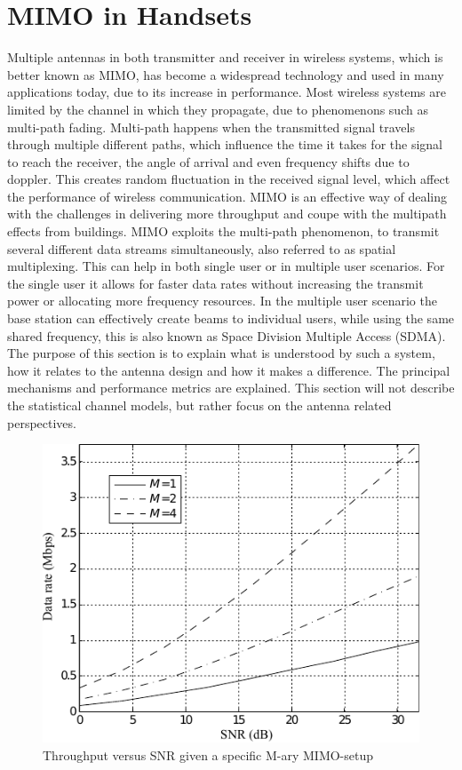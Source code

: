 \section{MIMO in Handsets}
\label{sec:mimo_in_handsets}
Multiple antennas in both transmitter and receiver in wireless systems, which is better known as MIMO, has become a widespread technology and used in many applications today, due to its increase in performance. Most wireless systems are limited by the channel in which they propagate, due to phenomenons such as multi-path fading. Multi-path happens when the transmitted signal travels through multiple different paths, which influence the time it takes for the signal to reach the receiver, the angle of arrival and even frequency shifts due to doppler. This creates random fluctuation in the received signal level, which affect the performance of wireless communication. MIMO is an effective way of dealing with the challenges in delivering more throughput and coupe with the multipath effects from buildings. MIMO exploits the multi-path phenomenon, to transmit several different data streams simultaneously, also referred to as spatial multiplexing. This can help in both single user or in multiple user scenarios. For the single user it allows for faster data rates without increasing the transmit power or allocating more frequency resources. In the multiple user scenario the base station can effectively create beams to individual users, while using the same shared frequency, this is also known as Space Division Multiple Access (SDMA). The purpose of this section is to explain what is understood by such a system, how it relates to the antenna design and how it makes a difference. The principal mechanisms and performance metrics are explained. This section will not describe the statistical channel models, but rather focus on the antenna related perspectives. 

\begin{figure}[htbp]
  \centering
  \includegraphics[scale=1.2]{img/analysis/datarateMimo}
  \caption{Throughput versus SNR given a specific M-ary MIMO-setup\cite{Ezio2007MIMO}}
  \label{fig:mimo-throughput}
\end{figure}

